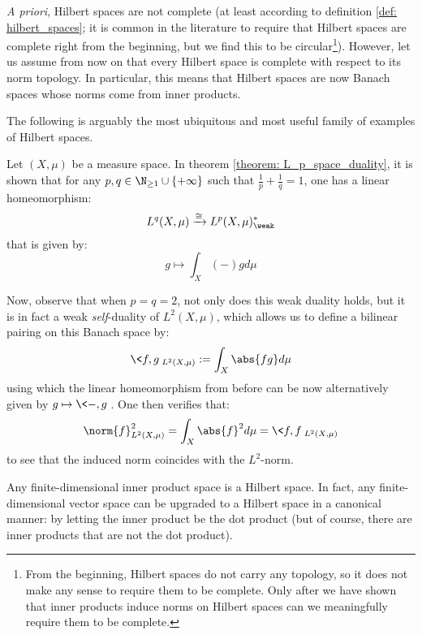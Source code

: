         \begin{convention}
            \textit{A priori}, Hilbert spaces are not complete (at least according to definition \ref{def: hilbert_spaces}; it is common in the literature to require that Hilbert spaces are complete right from the beginning, but we find this to be circular\footnote{From the beginning, Hilbert spaces do not carry any topology, so it does not make any sense to require them to be complete. Only after we have shown that inner products induce norms on Hilbert spaces can we meaningfully require them to be complete.}). However, let us assume from now on that every Hilbert space is complete with respect to its norm topology. In particular, this means that Hilbert spaces are now Banach spaces whose norms come from inner products.
        \end{convention}
        The following is arguably the most ubiquitous and most useful family of examples of Hilbert spaces.  
        \begin{example}[$L^2$-spaces] \label{example: L_2_spaces_as_hilbert_spaces}
            Let $(X, \mu)$ be a measure space. In theorem \ref{theorem: L_p_space_duality}, it is shown that for any $p, q \in \N_{\geq 1} \cup \{+\infty\}$ such that $\frac1p + \frac1q = 1$, one has a linear homeomorphism:
                $$L^q(X, \mu) \xrightarrow[]{\cong} L^p(X, \mu)^*_{\weak}$$
            that is given by:
                $$g \mapsto \int_X (-) g d\mu$$

            Now, observe that when $p = q = 2$, not only does this weak duality holds, but it is in fact a weak \textit{self}-duality of $L^2(X, \mu)$, which allows us to define a bilinear pairing on this Banach space by:
                $$\<f, g\>_{L^2(X, \mu)} := \int_X \abs{ fg } d\mu$$
            using which the linear homeomorphism from before can be now alternatively given by $g \mapsto \<-, g\>$. One then verifies that:
                $$\norm{f}_{L^2(X, \mu)}^2 = \int_X \abs{f}^2 d\mu = \<f, f\>_{L^2(X, \mu)}$$
            to see that the induced norm coincides with the $L^2$-norm.
        \end{example}
        \begin{example}
            Any finite-dimensional inner product space is a Hilbert space. In fact, any finite-dimensional vector space can be upgraded to a Hilbert space in a canonical manner: by letting the inner product be the dot product (but of course, there are inner products that are not the dot product).
        \end{example}

